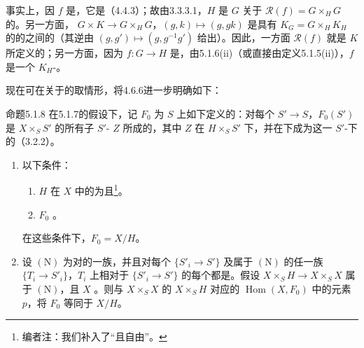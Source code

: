 事实上，因 $f$ 是，它是（4.4.3）；故由3.3.3.1，$H$ 是 $G$ 关于 $\mathscr R(f)=G\times_H G$ 的。另一方面， $G\times K\to G\times_H G$，$(g,k)\mapsto(g,gk)$ 是具有 $K_G=G\times_H K_H$ 的的之间的（其逆由 $(g,g')\mapsto(g,g^{-1}g')$ 给出）。因此，一方面 $\mathscr R(f)$ 就是 $K$ 所定义的；另一方面，因为 $f:G\to H$ 是，由5.1.6(ii)（或直接由定义5.1.5(ii)），$f$ 是一个 $K_H$-。

现在可在关于的取情形，将4.6.6进一步明确如下：
\begin{SGAresult}{命题}{5.1.8}
在5.1.7的假设下，记 $F_0$ 为 $S$ 上如下定义的：对每个 $S'\to S$，$F_0(S')$ 是 $X\times_S S'$ 的所有子 $S'$- $Z$ 所成的，其中 $Z$ 在 $H\times_S S'$ 下，并在下成为这一 $S'$-下的（3.2.2）。
\begin{enumerate}
\item[(i)] 以下条件：
\begin{enumerate}
\item[a)] $H$ 在 $X$ 中的为且\footnote{编者注：我们补入了“且自由”。}。
\item[b)] $F_0$ 。
\end{enumerate}
在这些条件下，$F_0=X/H$。
\item[(ii)] 设 $(\mathrm N)$ 为对的一族，并且对每个 $\{S'_i\to S'\}$ 及属于 $(\mathrm N)$ 的任一族 $\{T_i\to S'_i\}$，$T_i$ 上相对于 $\{S'_i\to S'\}$ 的每个都是。假设 $X\times_S H\to X\times_S X$ 属于 $(\mathrm N)$，且 $X$ 。则与 $X\times_S X$ 的 $X\times_S H$ 对应的 $\operatorname{Hom}(X,F_0)$ 中的元素 $p$，将 $F_0$ 等同于 $X/H$。
\end{enumerate}
\end{SGAresult}
